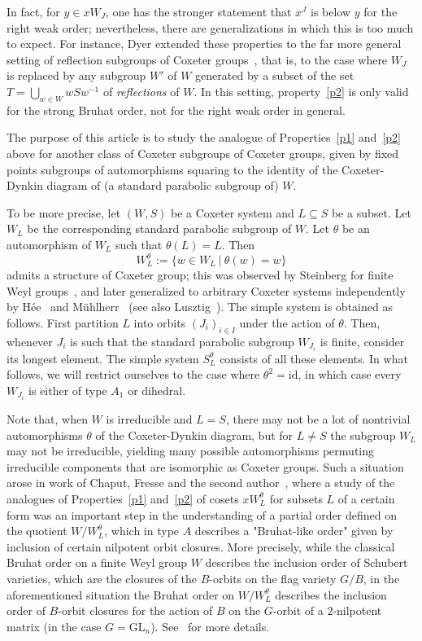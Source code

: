 \documentclass[ALCO, Unicode]{cedram}
\begin{document}
In fact, for $y\in x W_J$, one has the stronger statement that $x^J$ is below $y$ for the right weak order; nevertheless, there are generalizations in which this is too much to expect. For instance, Dyer extended these properties to the far more general setting of reflection subgroups of Coxeter groups~\cite[Theorem 1.4]{Dyer_Bruhat}, that is, to the case where $W_J$ is replaced by any subgroup $W'$ of $W$ generated by a subset of the set $T=\bigcup_{w\in W} w S w^{-1}$ of \textit{reflections} of $W$. In this setting, property~\ref{p2} is only valid for the strong Bruhat order, not for the right weak order in general.  

The purpose of this article is to study the analogue of Properties~\ref{p1} and~\ref{p2} above for another class of Coxeter subgroups of Coxeter groups, given by fixed points subgroups of automorphisms squaring to the identity of the Coxeter-Dynkin diagram of (a standard parabolic subgroup of) $W$. 

To be more precise, let $(W,S)$ be a Coxeter system and $L\subseteq S$ be a subset. Let $W_L$ be the corresponding standard parabolic subgroup of $W$. Let $\theta$ be an automorphism of $W_L$ such that $\theta(L)=L$. Then $$W_L^\theta:=\{w\in W_L \ \vert \ \theta(w)=w\}$$ admits a structure of Coxeter group; this was observed by Steinberg for finite Weyl groups~\cite[Section 11]{Steinberg}, and later generalized to arbitrary Coxeter systems independently by Hée~\cite{Hee_1} and Mühlherr~\cite{muhlh} (see also Lusztig~\cite[Appendix]{Lus_book}). The simple system is obtained as follows. First partition $L$ into orbits $(J_i)_{i\in I}$ under the action of $\theta$. Then, whenever $J_i$ is such that the standard parabolic subgroup $W_{J_i}$ is finite, consider its longest element. The simple system $S_L^\theta$ consists of all these elements. In what follows, we will restrict ourselves to the case where $\theta^2=\mathrm{id}$, in which case every $W_{J_i}$ is either of type $A_1$ or dihedral.  

Note that, when $W$ is irreducible and $L=S$, there may not be a lot of nontrivial automorphisms $\theta$ of the Coxeter-Dynkin diagram, but for $L\neq S$ the subgroup $W_L$ may not be irreducible, yielding many possible automorphisms permuting irreducible components that are isomorphic as Coxeter groups. Such a situation arose in work of Chaput, Fresse and the second author~\cite[Section 3]{CFG}, where a study of the analogues of Properties~\ref{p1} and~\ref{p2} of cosets $x W_L^\theta$ for subsets $L$ of a certain form was an important step in the understanding of a partial order defined on the quotient $W/W_L^\theta$, which in type $A$ describes a "Bruhat-like order" given by inclusion of certain nilpotent orbit closures. More precisely, while the classical Bruhat order on a finite Weyl group $W$ describes the inclusion order of Schubert varieties, which are the closures of the $B$-orbits on the flag variety $G/B$, in the aforementioned situation the Bruhat order on $W/W_L^\theta$ describes the inclusion order of $B$-orbit closures for the action of $B$ on the $G$-orbit of a $2$-nilpotent matrix (in the case $G=\mathrm{GL}_n$). See~\cite[Theorem 9.1]{CFG} for more details.   
\end{document}
